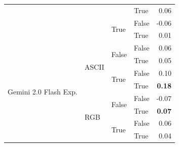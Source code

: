 \begin{tabular}{@{}llllr@{}}
                                                                        &                           &                           & True                      & 0.06 \\
                                                                        &                           & \multirow[c]{2}{*}{True}  & False                     & -0.06 \\
                                                                        &                           &                           & True                      & 0.01 \\
    \midrule                                                                                                                                                   
    \multirow[c]{8}{*}{Gemini 2.0 Flash Exp.}                           & \multirow[c]{4}{*}{ASCII} & \multirow[c]{2}{*}{False} & False                     & 0.06 \\
                                                                        &                           &                           & True                      & 0.05 \\
                                                                        &                           & \multirow[c]{2}{*}{True}  & False                     & 0.10 \\
                                                                        &                           &                           & True                      & \textbf{0.18} \\
    \cmidrule{2-5}                                                                                                                                             
                                                                        & \multirow[c]{4}{*}{RGB}   & \multirow[c]{2}{*}{False} & False                     & -0.07 \\
                                                                        &                           &                           & True                      & \textbf{0.07} \\
                                                                        &                           & \multirow[c]{2}{*}{True}  & False                     & 0.06 \\
                                                                        &                           &                           & True                      & 0.04 \\

\end{tabular}
